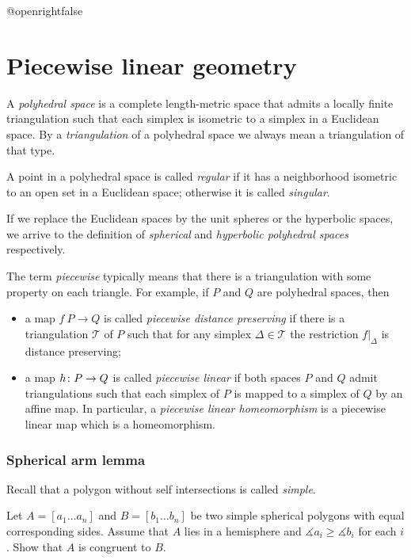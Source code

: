 \csname @openrightfalse\endcsname
\chapter{Piecewise linear geometry}


A \emph{polyhedral space} is a complete length-metric space that admits a locally finite triangulation 
such that each simplex is isometric to a simplex in a Euclidean space.
By a {}\emph{triangulation} of a polyhedral space we always mean a triangulation of that type. 

A point in a polyhedral space is called \emph{regular} if it has a neighborhood isometric to an open set in a Euclidean space;
otherwise it is called {}\emph{singular}.

If we replace the Euclidean spaces by the unit spheres or the hyperbolic spaces,
we arrive to the definition of {}\emph{spherical} and {}\emph{hyperbolic polyhedral spaces} respectively.

The term \emph{piecewise} typically means that there is a triangulation with some property on each triangle.
For example,  if $P$ and $Q$ are polyhedral spaces, then
\begin{itemize}
\item a map $f\:P\to Q$ is called {}\emph{piecewise distance preserving} if there is a triangulation $\mathcal{T}$ of $P$ such that for any simplex $\Delta\in \mathcal{T}$ the restriction $f|_\Delta$ is distance preserving;
\item a map $h\:P\z\to Q$  is called {}\emph{piecewise linear} if both spaces $P$ and $Q$ admit triangulations such that each simplex of $P$ is mapped to a simplex of $Q$ by an affine map.
In particular, a {}\emph{piecewise linear homeomorphism} is a piecewise linear map which is a homeomorphism.\label{piecewise linear map}
\end{itemize}





\subsection*{Spherical arm lemma}\label{Spherical arm lemma}

Recall that a polygon without self intersections is called \emph{simple}.

\begin{pr}
Let $A=[a_1\dots a_n]$ and $B=[b_1\dots b_n]$ be two simple spherical polygons 
with equal corresponding sides.
Assume that $A$ lies in a hemisphere and $\measuredangle a_i\ge\measuredangle b_i$ for each $i$.
Show that $A$ is congruent to $B$.
\end{pr}

